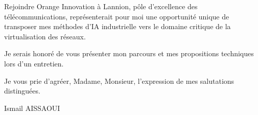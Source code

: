 \documentclass[11pt,a4paper]{article}
\begin{document}
Rejoindre Orange Innovation à Lannion, pôle d'excellence des télécommunications, représenterait pour moi une opportunité unique de transposer mes méthodes d'IA industrielle vers le domaine critique de la virtualisation des réseaux.

Je serais honoré de vous présenter mon parcours et mes propositions techniques lors d'un entretien.

Je vous prie d'agréer, Madame, Monsieur, l'expression de mes salutations distinguées.

\bigskip

\noindent Ismail AISSAOUI
\end{document}
